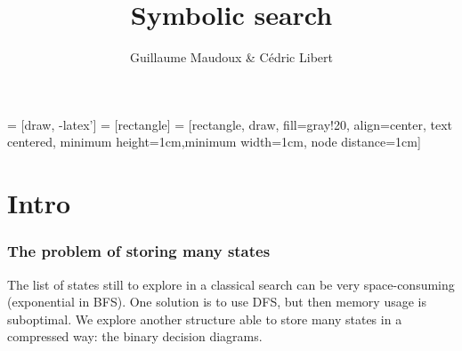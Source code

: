 \documentclass[10pt,a4paper]{beamer}
\author{Guillaume Maudoux \& Cédric Libert}
\title{Symbolic search}
\begin{document}
 = [draw, -latex']
 = [rectangle]
 = [rectangle, draw, fill=gray!20, align=center,
     text centered, minimum height=1cm,minimum width=1cm, node distance=1cm]	
\maketitle
\begin{frame}
\tableofcontents
\end{frame}
\section{Intro}
\begin{frame}
\frametitle{The problem of storing many states}

The list of states still to explore in a classical search can be very space-consuming (exponential in BFS).  One solution is to use DFS, but then memory usage is suboptimal.  We explore another structure able to store many states in a compressed way: the binary decision diagrams.

\end{frame}
\end{document}
